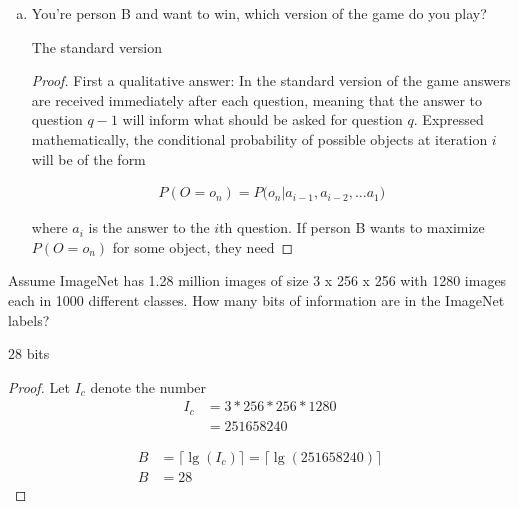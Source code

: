 \documentclass[11pt]{article}
\begin{document}
\noindent
\begin{enumerate}[(a)]\itemsep0pt
\item You're person B and want to win, which version of the game do you play?
	\begin{solution}
		The standard version
	\end{solution}

	\begin{proof}
		First a qualitative answer: In the standard version of the game
		answers are received immediately after each question, meaning that the
		answer to question $q-1$ will inform what should be asked for question
		$q$. Expressed mathematically, the conditional probability of possible
		objects at iteration $i$ will be of the form

		\begin{align}
			P(O=o_n) = P\bigg(o_n \Big\vert a_{i-1}, a_{i-2}, \dots a_{1}\bigg)
		\end{align}

		where $a_i$ is the answer to the $i$th question. If person B wants to
		maximize $P(O=o_n)$ for some object, they need
	\end{proof}
\end{enumerate}

Assume ImageNet has 1.28 million images of size 3 x 256 x 256 with 1280 images
each in 1000 different classes. How many bits of information are in the ImageNet
labels?

\begin{solution}
	$28$ bits
\end{solution}

\begin{proof}
	Let $I_c$ denote the number
	\begin{align}
		I_c &= 3 * 256  * 256 * 1280 \\
		&= 251658240
	\end{align}

	\begin{align}
		B &= \bigg\lceil\lg\left(I_c\right)\bigg\rceil
		=\bigg\lceil\lg\left(251658240\right)\bigg\rceil
		\\
		B &= 28
	\end{align}
\end{proof}
\end{document}
